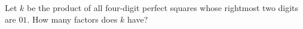 Let $k$ be the product of all four-digit perfect squares whose rightmost two digits are $01$. How many factors does $k$ have?
